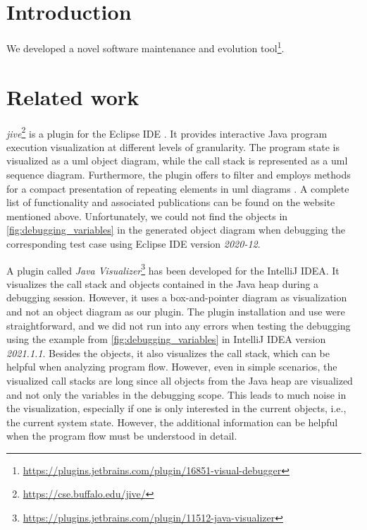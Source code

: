 \documentclass[conference]{IEEEtran}
\newcommand{\intellij}{IntelliJ IDEA}
\begin{document}
\section{Introduction}
We developed a novel software maintenance and evolution tool\footnote{\url{https://plugins.jetbrains.com/plugin/16851-visual-debugger}}.

\section{Related work} \label{sec:relatedWork}
\textit{\gls*{jive}}\footnote{\url{https://cse.buffalo.edu/jive/}} is a plugin for the Eclipse IDE \cite{czyzDeclarativeVisualDebugging2007,k.p.FiniteStateModel2021}.
It provides interactive Java program execution visualization at different levels of granularity.
The program state is visualized as a \gls*{uml} object diagram, while the call stack is represented as a \gls*{uml} sequence diagram.
Furthermore, the plugin offers to filter and employs methods for a compact presentation of repeating elements in \gls*{uml} diagrams \cite{jayaramanCompactVisualizationJava2017}.
A complete list of functionality and associated publications can be found on the website mentioned above.
Unfortunately, we could not find the objects in \autoref{fig:debugging_variables} in the generated object diagram when debugging the corresponding test case using Eclipse IDE version \textit{2020-12}.

A plugin called \textit{Java Visualizer}\footnote{\url{https://plugins.jetbrains.com/plugin/11512-java-visualizer}} has been developed for the \intellij{}.
It visualizes the call stack and objects contained in the Java heap during a debugging session.
However, it uses a box-and-pointer diagram as visualization and not an object diagram as our plugin.
The plugin installation and use were straightforward, and we did not run into any errors when testing the debugging using the example from \autoref{fig:debugging_variables} in \intellij{} version \textit{2021.1.1}.
Besides the objects, it also visualizes the call stack, which can be helpful when analyzing program flow.
However, even in simple scenarios, the visualized call stacks are long since all objects from the Java heap are visualized and not only the variables in the debugging scope.
This leads to much noise in the visualization, especially if one is only interested in the current objects, i.e., the current system state.
However, the additional information can be helpful when the program flow must be understood in detail. 
\end{document}
